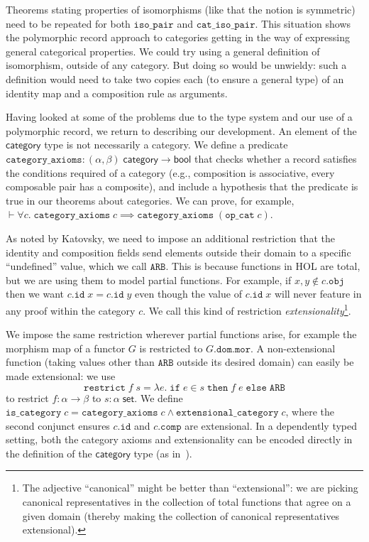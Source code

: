 \documentclass[twoside,titlepage,11pt]{article}
\begin{document}
Theorems stating properties of isomorphisms (like that the notion is symmetric) need to be repeated for both $\mathtt{iso\_pair}$ and $\mathtt{cat\_iso\_pair}$. 
This situation shows the polymorphic record approach to categories getting in the way of expressing general categorical properties.
We could try using a general definition of isomorphism, outside of any category.
But doing so would be unwieldy: such a definition would need to take two copies each (to ensure a general type) of an identity map and a composition rule as arguments.

Having looked at some of the problems due to the type system and our use of a polymorphic record, we return to describing our development.
An element of the $\mathsf{category}$ type is not necessarily a category.
We define a predicate $\mathtt{category\_axioms}:(\alpha,\beta)\;\mathsf{category}\to\mathsf{bool}$ that checks whether a record satisfies the conditions required of a category (e.g., composition is associative, every composable pair has a composite), and include a hypothesis that the predicate is true in our theorems about categories.
We can prove, for example, $\vdash\forall{c}.\;\mathtt{category\_axioms}\;c\implies\mathtt{category\_axioms}\;(\mathtt{op\_cat}\;c)$.

As noted by Katovsky, we need to impose an additional restriction that the identity and composition fields send elements outside their domain to a specific ``undefined'' value, which we call $\mathtt{ARB}$.
This is because functions in HOL are total, but we are using them to model partial functions.
For example, if $x,y\notin c.\mathtt{obj}$ then we want $c.\mathtt{id}\;x=c.\mathtt{id}\;y$ even though the value of $c.\mathtt{id}\;x$ will never feature in any proof within the category $c$.
We call this kind of restriction \emph{extensionality}\footnote{The adjective ``canonical'' might be better than ``extensional'': we are picking canonical representatives in the collection of total functions that agree on a given domain (thereby making the collection of canonical representatives extensional).}.

We impose the same restriction wherever partial functions arise, for example the morphism map of a functor $G$ is restricted to $G.\mathtt{dom}.\mathtt{mor}$.
A non-extensional function (taking values other than $\mathtt{ARB}$ outside its desired domain) can easily be made extensional: we use $$\mathtt{restrict}\;f\;s=\lambda{e}.\;\mathtt{if}\;e\in s\;\mathtt{then}\;f\;e\;\mathtt{else}\;\mathtt{ARB}$$ to restrict $f:\alpha\to\beta$ to $s:\alpha\;\mathsf{set}$.
We define $\mathtt{is\_category}\;c=\mathtt{category\_axioms}\;c\land\mathtt{extensional\_category}\;c$, where the second conjunct ensures $c.\mathtt{id}$ and $c.\mathtt{comp}$ are extensional.
In a dependently typed setting, both the category axioms and extensionality can be encoded directly in the definition of the $\mathsf{category}$ type (as in~\cite{DBLP:conf/birthday/HuetS00,Sozeau,Megacz}).
\end{document}
